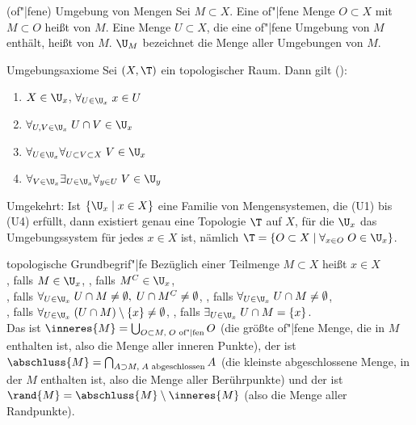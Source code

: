 \begin{Def}{(of"|fene) Umgebung von Mengen}
    Sei $M \subset X$.
    Eine of"|fene Menge $O \subset X$ mit $M \subset O$ heißt
     von $M$.
    Eine Menge $U \subset X$, die eine of"|fene Umgebung von $M$ enthält,
    heißt  von $M$.
    $\U_M$ bezeichnet die Menge aller Umgebungen von $M$.
\end{Def}

\linie

\begin{Satz}{Umgebungsaxiome}
    Sei $(X, \T)$ ein topologischer Raum.
    Dann gilt ():
    \begin{enumerate}[label=(U\arabic*)]
        \item
        $X \in \U_x$, $\forall_{U \in \U_x}\; x \in U$

        \item
        $\forall_{U, V \in \U_x}\; U \cap V \in \U_x$

        \item
        $\forall_{U \in \U_x} \forall_{U \subset V \subset X}\; V \in \U_x$

        \item
        $\forall_{V \in \U_x} \exists_{U \in \U_x} \forall_{y \in U}\;
        V \in \U_y$
    \end{enumerate}
    Umgekehrt:
    Ist $\{\U_x \;|\; x \in X\}$ eine Familie von Mengensystemen,
    die (U1) bis (U4) erfüllt,
    dann existiert genau eine Topologie $\T$ auf $X$, für die
    $\U_x$ das Umgebungssystem für jedes $x \in X$ ist, nämlich
    $\T = \{O \subset X \;|\; \forall_{x \in O}\; O \in \U_x\}$.
\end{Satz}

\linie

\begin{Def}{topologische Grundbegrif"|fe}
    Bezüglich einer Teilmenge $M \subset X$ heißt $x \in X$ \\
    , falls $M \in \U_x$, \qquad
    , falls $M^C \in \U_x$, \\
    , falls $\forall_{U \in \U_x}\; U \cap M \not= \emptyset,\;
    U \cap M^C \not= \emptyset$, \qquad
    , falls
    $\forall_{U \in \U_x}\; U \cap M \not= \emptyset$, \\
    , falls $\forall_{U \in \U_x}\;
    (U \cap M) \setminus \{x\} \not= \emptyset$, \qquad
    , falls
    $\exists_{U \in \U_x}\; U \cap M = \{x\}$. \\
    Das  ist
    $\inneres{M} = \bigcup_{O \subset M,\; O \text{ of"|fen}} O$
    (die größte of"|fene Menge, die in $M$ enthalten ist,
    also die Menge aller inneren Punkte),
    der  ist
    $\abschluss{M} = \bigcap_{A \supset M,\; A \text{ abgeschlossen}} A$
    (die kleinste abgeschlossene Menge, in der $M$ enthalten ist,
    also die Menge aller Berührpunkte)
    und der  ist $\rand{M} = \abschluss{M} \setminus \inneres{M}$
    (also die Menge aller Randpunkte).
\end{Def}

